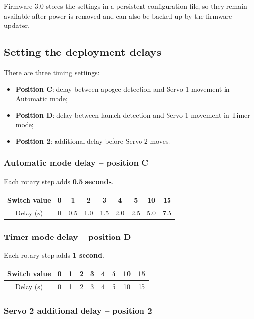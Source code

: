 \documentclass[11pt,a4paper]{article}
\begin{document}
Firmware 3.0 stores the settings in a persistent configuration file, so they remain available after power is removed and can also be backed up by the firmware updater.

\subsection{Setting the deployment delays}

There are three timing settings:

\begin{itemize}
    \item \textbf{Position C}: delay between apogee detection and Servo 1 movement in Automatic mode;
    \item \textbf{Position D}: delay between launch detection and Servo 1 movement in Timer mode;
    \item \textbf{Position 2}: additional delay before Servo 2 moves.
\end{itemize}

\subsubsection*{Automatic mode delay -- position C}

Each rotary step adds \textbf{0.5 seconds}.

\begin{center}
\begin{tabular}{c|cccccccc}
Switch value & 0 & 1 & 2 & 3 & 4 & 5 & 10 & 15 \\
\hline
Delay (s) & 0 & 0.5 & 1.0 & 1.5 & 2.0 & 2.5 & 5.0 & 7.5
\end{tabular}
\end{center}

\subsubsection*{Timer mode delay -- position D}

Each rotary step adds \textbf{1 second}.

\begin{center}
\begin{tabular}{c|cccccccc}
Switch value & 0 & 1 & 2 & 3 & 4 & 5 & 10 & 15 \\
\hline
Delay (s) & 0 & 1 & 2 & 3 & 4 & 5 & 10 & 15
\end{tabular}
\end{center}

\subsubsection*{Servo 2 additional delay -- position 2}
\end{document}
